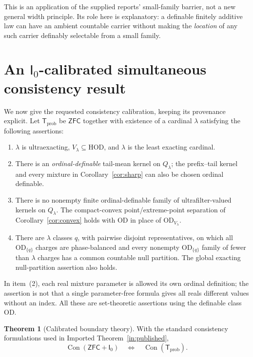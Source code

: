 \documentclass[11pt,letterpaper]{article}
\theoremstyle{definition}
\newtheorem{theorem}[definition]{Theorem}
\newcommand{\ZFC}{\mathsf{ZFC}}
\newcommand{\OD}{\mathrm{OD}}
\newcommand{\HOD}{\mathrm{HOD}}
\newcommand{\Con}{\operatorname{Con}}
\newcommand{\Izero}{\mathsf I_0}
\newcommand{\ODlam}{\OD_{V_\lambda}}
\newcommand{\Qlam}{Q_\lambda}
\begin{document}
This is an application of the supplied reports' small-family barrier, not a new general width principle. Its role here is explanatory: a definable finitely additive law can have an ambient countable carrier without making the \emph{location} of any such carrier definably selectable from a small family.

\section{An \texorpdfstring{$\Izero$}{I0}-calibrated simultaneous consistency result}\label{sec:consistency}

We now give the requested consistency calibration, keeping its provenance explicit. Let $\mathsf T_{\mathrm{prob}}$ be $\ZFC$ together with existence of a cardinal $\lambda$ satisfying the following assertions:
\begin{enumerate}
\item $\lambda$ is ultraexacting, $V_\lambda\subseteq\HOD$, and $\lambda$ is the least exacting cardinal.
\item There is an \emph{ordinal-definable} tail-mean kernel on $\Qlam$; the prefix--tail kernel and every mixture in Corollary~\ref{cor:sharp} can also be chosen ordinal definable.
\item There is no nonempty finite ordinal-definable family of ultrafilter-valued kernels on $\Qlam$. The compact-convex point/extreme-point separation of Corollary~\ref{cor:convex} holds with $\OD$ in place of $\ODlam$.
\item There are $\lambda$ classes $q$, with pairwise disjoint representatives, on which all $\OD_{\{q\}}$ charges are phase-balanced and every nonempty $\OD_{\{q\}}$ family of fewer than $\lambda$ charges has a common countable null partition. The global exacting null-partition assertion also holds.
\end{enumerate}
In item~(2), each real mixture parameter is allowed its own ordinal definition; the assertion is not that a single parameter-free formula gives all reals different values without an index. All these are set-theoretic assertions using the definable class $\OD$.

\begin{theorem}[Calibrated boundary theory]\label{thm:consistency}
With the standard consistency formulations used in Imported Theorem~\ref{in:published},
\begin{equation}\label{eq:equicons}
 \Con(\ZFC+\Izero)\quad\Longleftrightarrow\quad
 \Con(\mathsf T_{\mathrm{prob}}).
\end{equation}
\end{theorem}
\end{document}
